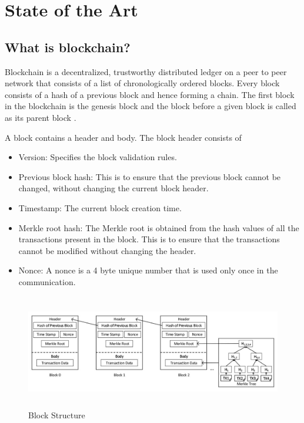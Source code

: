 \chapter{State of the Art}
\label{ch:SOTA}

\section{What is blockchain?}
Blockchain is a decentralized, trustworthy distributed ledger on a peer to peer network that consists of a list of chronologically ordered blocks. Every block consists of a hash of a previous block and hence forming a chain. The first block in the blockchain is the genesis block and the block before a given block is called as its parent block \cite{blockchain}.

A block contains a header and body. The block header consists of 
\begin{itemize}
    \item Version: Specifies the block validation rules.
    \item Previous block hash: This is to ensure that the previous block cannot be changed, without changing the current block header.
    \item Timestamp: The current block creation time.
    \item Merkle root hash: The Merkle root is obtained from the hash values of all the transactions present in the block. This is to ensure that the transactions cannot be modified without changing the header.
    \item Nonce: A nonce is a 4 byte unique number that is used only once in the communication.
\end{itemize}

\begin{figure}[htbp]
 \centering
 \includegraphics[width=1\textwidth, height=5cm]{gfx/figures/Block structure.JPG}
 \caption{Block Structure \cite{blockStructure}}
 \label{fig:chapter03:setup}
\end{figure}

